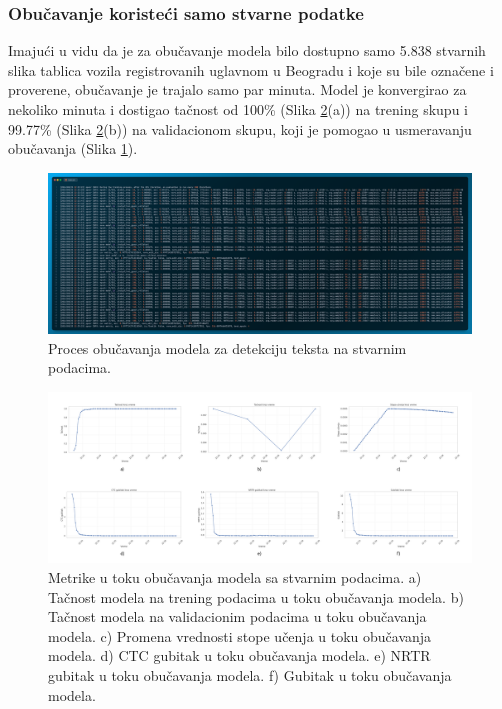 \documentclass[a4paper,12pt]{article}
\begin{document}
	\subsubsection{Obučavanje koristeći samo stvarne podatke}
	
	Imajući u vidu da je za obučavanje modela bilo dostupno samo 5.838 stvarnih slika tablica vozila registrovanih uglavnom u Beogradu i koje su bile označene i proverene, obučavanje je trajalo samo par minuta. Model je konvergirao za nekoliko minuta i dostigao tačnost od 100\% (Slika \ref{fig:real-data-metrics}(a)) na trening skupu i 99.77\% (Slika \ref{fig:real-data-metrics}(b)) na validacionom skupu, koji je pomogao u usmeravanju obučavanja (Slika \ref{fig:train-code-real-data}).
	
	\begin{figure}[H]
		\centering
		\includegraphics[width=\textwidth]{assets/train-code-real-data.png}
		\caption{Proces obučavanja modela za detekciju teksta na stvarnim podacima.}
		\label{fig:train-code-real-data}
	\end{figure}
	
	\begin{figure}[H]
		\centering
		\includegraphics[width=\textwidth]{assets/real-data-metrics.png}
		\caption{Metrike u toku obučavanja modela sa stvarnim podacima. a) Tačnost modela na trening podacima u toku obučavanja modela. b) Tačnost modela na validacionim podacima u toku obučavanja modela. c) Promena vrednosti stope učenja u toku obučavanja modela. d) CTC gubitak u toku obučavanja modela. e) NRTR gubitak u toku obučavanja modela. f) Gubitak u toku obučavanja modela.}
		\label{fig:real-data-metrics}
	\end{figure}
	
\end{document}
